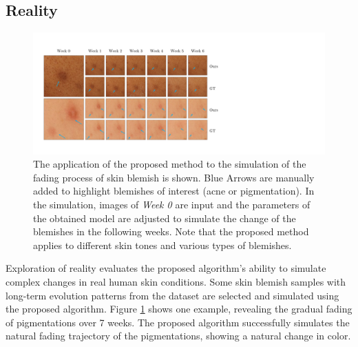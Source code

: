 \begin{spacing}{1.5}
\section{Reality}
\begin{figure}[t!]
    \centering
        \includegraphics[width=\columnwidth]{Chapter5/forward3.pdf}
    \caption{The application of the proposed method to the simulation of the fading process of skin blemish is shown. Blue Arrows are manually added to highlight blemishes of interest (acne or pigmentation). In the simulation, images of \textit{Week 0} are input and the parameters of the obtained model are adjusted to simulate the change of the blemishes in the following weeks. Note that the proposed method applies to different skin tones and various types of blemishes.}
    \label{fig:forward}
\end{figure}
Exploration of reality evaluates the proposed algorithm's ability to simulate complex changes in real human skin conditions. Some skin blemish samples with long-term evolution patterns from the dataset are selected and simulated using the proposed algorithm. Figure \ref{fig:forward} shows one example, revealing the gradual fading of pigmentations over 7 weeks. The proposed algorithm successfully simulates the natural fading trajectory of the pigmentations, showing a natural change in color.


\end{spacing}
